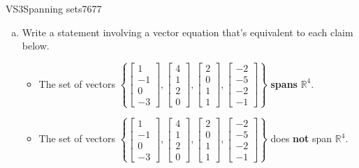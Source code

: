 \begin{exercise}{VS3}{Spanning sets}{7677} 
\begin{exerciseStatement} 

\begin{enumerate}[(a)]
\item  

 Write a statement involving a vector equation that's equivalent to each claim below. 

 

\begin{itemize}
\item  

 The set of vectors \(\left\{ \left[\begin{array}{c}
1 \\
-1 \\
0 \\
-3
\end{array}\right] , \left[\begin{array}{c}
4 \\
1 \\
2 \\
0
\end{array}\right] , \left[\begin{array}{c}
2 \\
0 \\
1 \\
1
\end{array}\right] , \left[\begin{array}{c}
-2 \\
-5 \\
-2 \\
-1
\end{array}\right] \right\}\) \textbf{spans} \(\mathbb R^4\). 

 
\item  

 The set of vectors \(\left\{ \left[\begin{array}{c}
1 \\
-1 \\
0 \\
-3
\end{array}\right] , \left[\begin{array}{c}
4 \\
1 \\
2 \\
0
\end{array}\right] , \left[\begin{array}{c}
2 \\
0 \\
1 \\
1
\end{array}\right] , \left[\begin{array}{c}
-2 \\
-5 \\
-2 \\
-1
\end{array}\right] \right\}\) does \textbf{not} span \(\mathbb R^4\). 


\end{itemize}
\end{enumerate}
\end{exerciseStatement}
\end{exercise}
